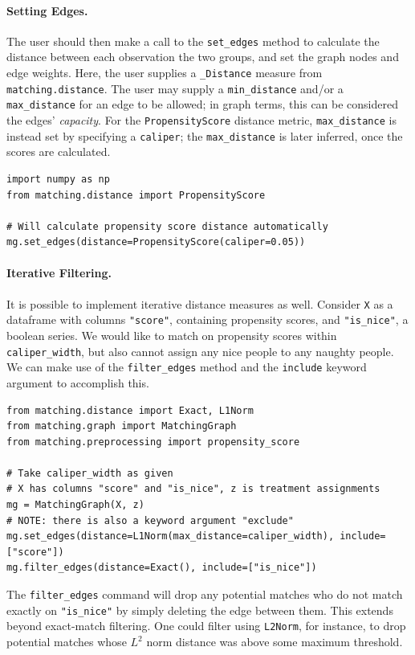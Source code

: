 \documentclass[11pt]{extarticle}
\begin{document}
\paragraph{Setting Edges.} The user should then make a call to the \texttt{set\_edges} method to calculate the distance between each observation the two groups, and set the graph nodes and edge weights. Here, the user supplies a \texttt{\_Distance} measure from \texttt{matching.distance}. The user may supply a \texttt{min\_distance} and/or a \texttt{max\_distance} for an edge to be allowed; in graph terms, this can be considered the edges' \emph{capacity}. For the \texttt{PropensityScore} distance metric, \texttt{max\_distance} is instead set by specifying a \texttt{caliper}; the \texttt{max\_distance} is later inferred, once the scores are calculated.
\begin{verbatim}
import numpy as np
from matching.distance import PropensityScore

# Will calculate propensity score distance automatically
mg.set_edges(distance=PropensityScore(caliper=0.05))
\end{verbatim}
\paragraph{Iterative Filtering.} It is possible to implement iterative distance measures as well. Consider \texttt{X} as a dataframe with columns \texttt{"score"}, containing propensity scores, and \texttt{"is\_nice"}, a boolean series. We would like to match on propensity scores within \texttt{caliper\_width}, but also cannot assign any nice people to any naughty people. We can make use of the \texttt{filter\_edges} method and the \texttt{include} keyword argument to accomplish this.
\begin{verbatim}
from matching.distance import Exact, L1Norm
from matching.graph import MatchingGraph
from matching.preprocessing import propensity_score

# Take caliper_width as given
# X has columns "score" and "is_nice", z is treatment assignments
mg = MatchingGraph(X, z)
# NOTE: there is also a keyword argument "exclude"
mg.set_edges(distance=L1Norm(max_distance=caliper_width), include=["score"])
mg.filter_edges(distance=Exact(), include=["is_nice"])
\end{verbatim}
The \texttt{filter\_edges} command will drop any potential matches who do not match exactly on \texttt{"is\_nice"} by simply deleting the edge between them. This extends beyond exact-match filtering. One could filter using \texttt{L2Norm}, for instance, to drop potential matches whose $L^2$ norm distance was above some maximum threshold.
\end{document}
